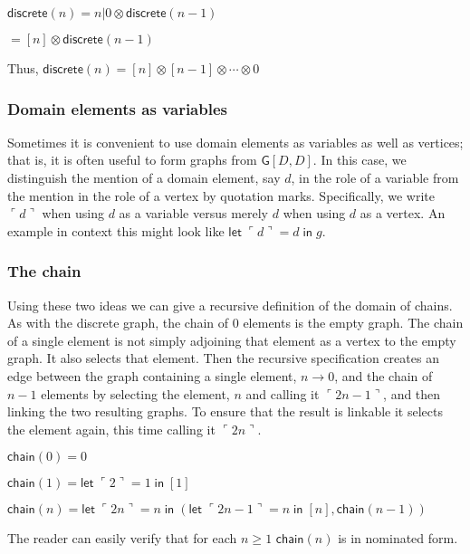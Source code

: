 \documentclass[12pt]{llncs}
\begin{document}
\(\mathsf{discrete}(n) = n | 0 \otimes \mathsf{discrete}(n-1)\)

\(= [n]\otimes \mathsf{discrete}(n-1)\)

Thus, \(\mathsf{discrete}(n) = [n]\otimes[n-1]\otimes\cdots\otimes0\)

\hypertarget{domain-elements-as-variables}{%
\subsubsection{Domain elements as
variables}\label{domain-elements-as-variables}}

Sometimes it is convenient to use domain elements as variables as well
as vertices; that is, it is often useful to form graphs from
\(\mathsf{G}[D,D]\). In this case, we distinguish the mention of a
domain element, say \(d\), in the role of a variable from the mention in
the role of a vertex by quotation marks. Specifically, we write
\(\ulcorner d\urcorner\) when using \(d\) as a variable versus merely
\(d\) when using \(d\) as a vertex. An example in context this might
look like
\(\mathsf{let}\; \ulcorner d\urcorner = d \; \mathsf{in}\; g\).

\hypertarget{the-chain}{%
\subsubsection{The chain}\label{the-chain}}

Using these two ideas we can give a recursive definition of the domain
of chains. As with the discrete graph, the chain of \(0\) elements is
the empty graph. The chain of a single element is not simply adjoining
that element as a vertex to the empty graph. It also selects that
element. Then the recursive specification creates an edge between the
graph containing a single element, \(n \to 0\), and the chain of \(n-1\)
elements by selecting the element, \(n\) and calling it
\(\ulcorner 2n-1\urcorner\), and then linking the two resulting graphs.
To ensure that the result is linkable it selects the element again, this
time calling it \(\ulcorner 2n \urcorner\).

\(\mathsf{chain}(0) = 0\)

\(\mathsf{chain}(1) = \mathsf{let}\; \ulcorner 2\urcorner = 1 \; \mathsf{in}\; [1]\)

\(\mathsf{chain}(n) = \mathsf{let}\; \ulcorner2n\urcorner = n \; \mathsf{in}\;(\mathsf{let}\; \ulcorner 2n-1\urcorner = n \; \mathsf{in}\; [n], \mathsf{chain}(n-1))\)

The reader can easily verify that for each \(n \geq 1\)
\(\mathsf{chain}(n)\) is in nominated form.
\end{document}
